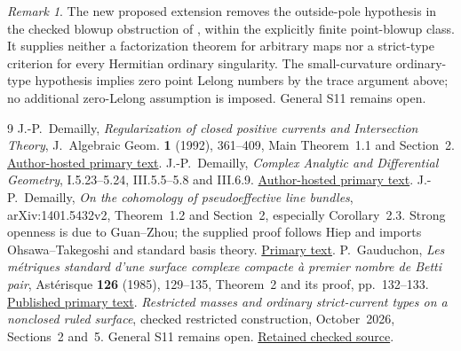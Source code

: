 \documentclass[11pt]{article}
\theoremstyle{remark}
\newtheorem{remark}[theorem]{Remark}
\begin{document}
\begin{remark}
The new proposed extension removes the outside-pole hypothesis in the
checked blowup obstruction of \cite{Ruled}, within the explicitly finite
point-blowup class. It supplies neither a factorization theorem for arbitrary
maps nor a strict-type criterion for every Hermitian ordinary singularity.
The small-curvature ordinary-type hypothesis implies zero point Lelong
numbers by the trace argument above; no additional zero-Lelong assumption
is imposed. General S11 remains open.
\end{remark}

\begin{thebibliography}{9}
 J.-P.~Demailly,
\emph{Regularization of closed positive currents and Intersection Theory},
J.~Algebraic Geom. \textbf{1} (1992), 361--409,
Main Theorem~1.1 and Section~2.
\href{https://www-fourier.univ-grenoble-alpes.fr/~demailly/manuscripts/regularization.pdf}{Author-hosted primary text}.
 J.-P.~Demailly,
\emph{Complex Analytic and Differential Geometry}, I.5.23--5.24, III.5.5--5.8 and III.6.9.
\href{https://www-fourier.univ-grenoble-alpes.fr/~demailly/manuscripts/agbook.pdf}{Author-hosted primary text}.
 J.-P.~Demailly,
\emph{On the cohomology of pseudoeffective line bundles},
arXiv:1401.5432v2, Theorem~1.2 and Section~2, especially Corollary~2.3.
Strong openness is due to Guan--Zhou; the supplied proof follows Hiep
and imports Ohsawa--Takegoshi and standard basis theory.
\href{https://arxiv.org/abs/1401.5432}{Primary text}.
 P.~Gauduchon,
\emph{Les m\'etriques standard d'une surface complexe compacte \`a premier
nombre de Betti pair}, Ast\'erisque \textbf{126} (1985), 129--135,
Theorem~2 and its proof, pp.~132--133.
\href{https://www.numdam.org/item/AST_1985__126__129_0/}{Published primary text}.
 \emph{Restricted masses and ordinary strict-current types
on a nonclosed ruled surface}, checked restricted construction, October~2026,
Sections~2 and~5. General S11 remains open.
\href{https://github.com/MingchenXia/non-kahler-pluripotential-theory/blob/2ec45dec6172ced6e2af18b2b5fe657c07aeee9e/research/papers/S11-nonclosed-ruled-restricted-masses-and-strict-types.tex}{Retained checked source}.
\end{thebibliography}
\end{document}
